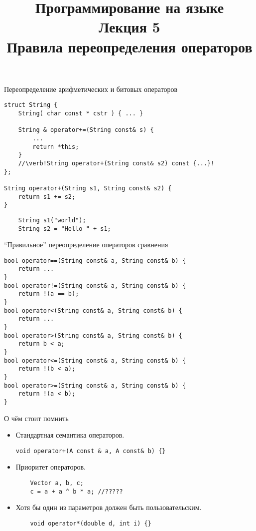 \documentclass{beamer}
\title{{\bf Программирование на языке \langcpp\protect\\Лекция
5\protect\vspace{1em}\\}Правила переопределения операторов}
\begin{document}
\begin{frame} 
  \titlepage
\end{frame}

\begin{frame}[fragile]{Переопределение арифметических и битовых операторов}
    \begin{lstlisting}
struct String {
    String( char const * cstr ) { ... }

    String & operator+=(String const& s) {
        ...
        return *this;    
    }
    //\verb!String operator+(String const& s2) const {...}!
};

String operator+(String s1, String const& s2) { 
    return s1 += s2; 
}
    \end{lstlisting}
    \begin{lstlisting}
    String s1("world");
    String s2 = "Hello " + s1;
    \end{lstlisting}
\end{frame}

\begin{frame}[fragile]{``Правильное'' переопределение операторов сравнения}
    \begin{lstlisting}[basicstyle=\fontsize{9pt}{1em}\ttfamily]
bool operator==(String const& a, String const& b) {
    return ...
}
bool operator!=(String const& a, String const& b) {
    return !(a == b);
}
bool operator<(String const& a, String const& b) {
    return ...
}
bool operator>(String const& a, String const& b) {
    return b < a;
}
bool operator<=(String const& a, String const& b) {
    return !(b < a);
}
bool operator>=(String const& a, String const& b) {
    return !(a < b);
}
    \end{lstlisting}
\end{frame}

\begin{frame}[fragile]{О чём стоит помнить}
    \begin{itemize}
        \item Стандартная семантика операторов.
\begin{lstlisting}
void operator+(A const & a, A const& b) {}
\end{lstlisting}
        \item Приоритет операторов.
\begin{lstlisting}
    Vector a, b, c;
    c = a + a ^ b * a; //?????
\end{lstlisting}
    \item Хотя бы один из параметров
            должен быть пользовательским.
\begin{lstlisting}
    void operator*(double d, int i) {}
\end{lstlisting}
    \end{itemize}
\end{frame}
\end{document}
